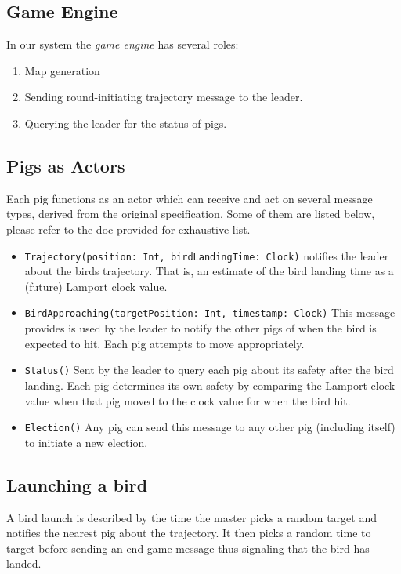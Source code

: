 \documentclass[]{article}
\begin{document}
\subsection{Game Engine}

In our system the \emph{game engine} has several roles:

\begin{enumerate}[1.]
\item
  Map generation
\item
  Sending round-initiating trajectory message to the leader.
\item
  Querying the leader for the status of pigs. 
\end{enumerate}

\subsection{Pigs as Actors}

Each pig functions as an actor which can receive and act on several
message types, derived from the original specification. Some of them are listed below,
please refer to the doc provided for exhaustive list.

\begin{itemize}
\item
  \texttt{Trajectory(position: Int, birdLandingTime: Clock)} notifies the leader about the birds trajectory. That is, an estimate of the bird landing time as a (future) Lamport clock value.
\item
  \texttt{BirdApproaching(targetPosition: Int, timestamp: Clock)} This message provides is used by the leader to notify the other pigs of when the bird is expected to hit. Each pig attempts to move appropriately.
\item
  \texttt{Status()} Sent by the leader to query each pig about its safety after the bird landing. Each pig determines its own safety by comparing the Lamport clock value when that pig moved to the clock value for when the bird hit.
\item
  \texttt{Election()} Any pig can send this message to any other pig (including itself) to initiate a new election.
\end{itemize}

\subsection{Launching a bird}

A bird launch is described by the time the master picks a random target
and notifies the nearest pig about the trajectory. It then picks a
random time to target before sending an end game message thus signaling
that the bird has landed.
\end{document}
